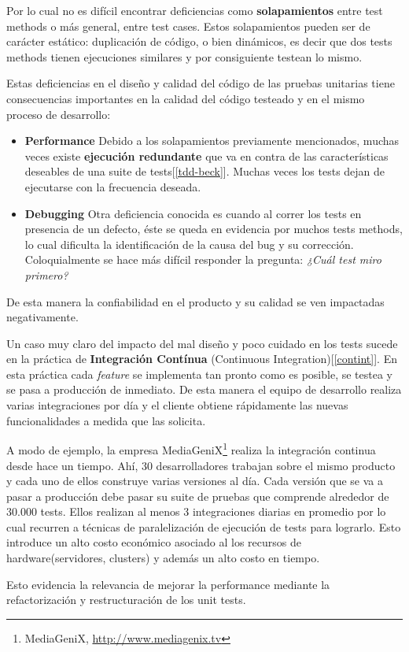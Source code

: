 \par Por lo cual no es difícil encontrar deficiencias como \textbf{solapamientos} entre test methods o más general, entre test cases. Estos solapamientos pueden ser de carácter estático: duplicación de código, o bien dinámicos, es decir que dos tests methods tienen ejecuciones similares y por consiguiente testean lo mismo. 
\par Estas deficiencias en el diseño y calidad del código de las pruebas unitarias tiene consecuencias importantes en la calidad del código testeado y en el mismo proceso de desarrollo:
\begin{itemize}
\item \textbf{Performance} Debido a los solapamientos previamente mencionados, muchas veces existe \textbf{ejecución redundante} que va en contra de las características deseables de una suite de tests[\ref{tdd-beck}]. Muchas veces los tests dejan de ejecutarse con la frecuencia deseada.
\item \textbf{Debugging} Otra deficiencia conocida es cuando al correr los tests en presencia de un defecto, éste se queda en evidencia por muchos tests methods, lo cual dificulta la identificación de la causa del bug y su corrección. Coloquialmente se hace más difícil responder la pregunta: \emph{¿Cuál test miro primero?}
\end{itemize}
 
\par De esta manera la confiabilidad en el producto y su calidad se ven impactadas negativamente. 

\par Un caso muy claro del impacto del mal diseño y poco cuidado en los tests sucede en la práctica de \textbf{Integración Contínua} (Continuous Integration)[\ref{contint}]. En esta práctica cada \emph{feature} se implementa tan pronto como es posible, se testea y se pasa a producción de inmediato. De esta manera el equipo de desarrollo realiza varias integraciones por día y el cliente obtiene rápidamente las nuevas funcionalidades a medida que las solicita. \\

\par A modo de ejemplo, la empresa MediaGeniX\footnote{MediaGeniX, \url{http://www.mediagenix.tv}} realiza la integración continua desde hace un tiempo. Ahí, 30 desarrolladores trabajan sobre el mismo producto y cada uno de ellos construye varias versiones al día. Cada versión que se va a pasar a producción debe pasar su suite de pruebas que comprende alrededor de 30.000 tests. Ellos realizan al menos 3 integraciones diarias en promedio por lo cual recurren a técnicas de paralelización de ejecución de tests para lograrlo. Esto introduce un alto costo económico asociado al los recursos de hardware(servidores, clusters) y además un alto costo en tiempo.\\

\par Esto evidencia la relevancia de mejorar la performance mediante la refactorización y restructuración de los unit tests.
